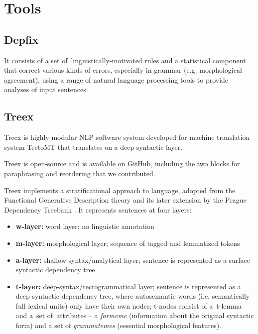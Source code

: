 \chapter{Tools}

\section{Depfix}
\label{tools_depfix}
 It consists of a
set of~linguistically-motivated rules and a statistical component that correct
various kinds of errors, especially in grammar (e.g. morphological agreement),
using a range of natural language processing tools to provide analyses of input 
sentences. 

\section{Treex}
\label{treex}

Treex \cite{treex} is highly modular NLP software system developed for machine translation system TectoMT \cite{tectomt} that translates on a deep syntactic layer. 

Treex is open-source and is available on GitHub, including the two blocks for paraphrasing and reordering that we contributed. 

Treex implements a stratificational approach to language, adopted from the Functional Generative Description theory \cite{FGP} and its later extension by the Prague Dependency Treebank \cite{PDT3.0}. 
It represents sentences at four layers:

\begin{itemize}
\item \textbf{w-layer:} word layer; no linguistic annotation
\item \textbf{m-layer:} morphological layer; sequence of tagged and lemmatized 
tokens
\item \textbf{a-layer:} shallow-syntax/analytical layer; sentence is 
represented as a surface syntactic dependency tree
\item \textbf{t-layer:} deep-syntax/tectogrammatical layer; sentence is 
represented as a deep-syntactic dependency tree, where autosemantic words (i.e.
semantically full lexical units) only have their own nodes; t-nodes consist of
a~t-lemma and a~set of~attributes -- a \textit{formeme} (information about the original syntactic form) and a set of \textit{grammatemes} 
(essential morphological features).
\end{itemize} 

